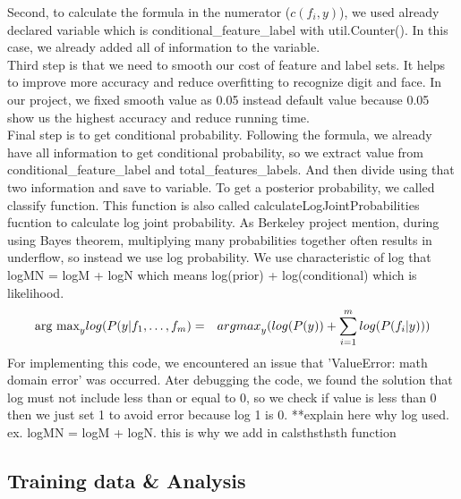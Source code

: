 \documentclass{article}
\begin{document}
        Second, to calculate the formula in the numerator ($c(f_i,y)$), we used already declared variable which is conditional\_feature\_label with util.Counter(). In this case, we already added all of information to the variable. \\
        
        Third step is that we need to smooth our cost of feature and label sets. It helps to improve more accuracy and reduce overfitting to recognize digit and face. In our project, we fixed smooth value as 0.05 instead default value because 0.05 show us the highest accuracy and reduce running time.\\
        
        Final step is to get conditional probability. Following the formula, we already have all information to get conditional probability, so we extract value from conditional\_feature\_label and total\_features\_labels. And then divide using that two information and save to variable. To get a posterior probability, we called classify function. This function is also called calculateLogJointProbabilities fucntion to calculate log joint probability. As Berkeley project mention, during using Bayes theorem, multiplying many probabilities together often results in underflow, so instead we use log probability. We use characteristic of log that logMN = logM + logN which means log(prior) + log(conditional) which is likelihood.
        \begin{eqnarray*}
        \textmd{arg max}_{y} log(P(y \vert f_1, \ldots, f_m) &=& {arg max}_{y} (log(P(y)) + \sum_{i = 1}^m log(P(f_i \vert y)))
        \end{eqnarray*}
        For implementing this code, we encountered an issue that 'ValueError: math domain error' was occurred. Ater debugging the code, we found the solution that log must not include less than or equal to 0, so we check if value is less than 0 then we just set 1 to avoid error because log 1 is 0.
        **explain here why log used. ex. logMN = logM + logN. this is why we add in calsthsthsth function

    \subsection{Training data \& Analysis}
\end{document}
